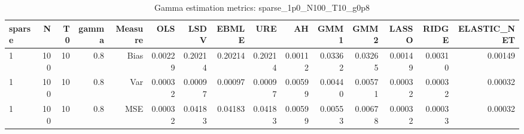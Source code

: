 \begin{table}[!htbp]\centering
\caption{Gamma estimation metrics: sparse_1p0_N100_T10_g0p8}
\label{tab:table1_sparse_1p0_N100_T10_g0p8}
\begin{tabular}{lrrrrrrrrrrrrrr}
\hline
sparse & N & T0 & gamma & Measure & OLS & LSDV & EBMLE & URE & AH & GMM1 & GMM2 & LASSO & RIDGE & ELASTIC_NET \\
\hline
1 & 100 & 10 & 0.8 & Bias & 0.00229 & 0.20214 & 0.20214 & 0.20214 & 0.00112 & 0.03362 & 0.03265 & 0.00149 & 0.00310 & 0.00149 \\
1 & 100 & 10 & 0.8 & Var & 0.00032 & 0.00097 & 0.00097 & 0.00097 & 0.00599 & 0.00440 & 0.00571 & 0.00032 & 0.00032 & 0.00032 \\
1 & 100 & 10 & 0.8 & MSE & 0.00032 & 0.04183 & 0.04183 & 0.04183 & 0.00599 & 0.00553 & 0.00678 & 0.00032 & 0.00033 & 0.00032 \\
\hline
\end{tabular}
\end{table}

